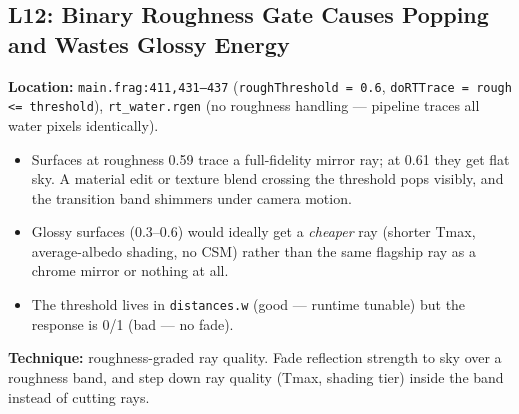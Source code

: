 \documentclass[11pt,a4paper]{article}
\begin{document}
\subsection{L12: Binary Roughness Gate Causes Popping and Wastes Glossy Energy}

\textbf{Location:} \texttt{main.frag:411,431--437} (\texttt{roughThreshold = 0.6}, \texttt{doRTTrace = rough \textless{}= threshold}), \texttt{rt\_water.rgen} (no roughness handling --- pipeline traces all water pixels identically).

\begin{itemize}
    \item Surfaces at roughness 0.59 trace a full-fidelity mirror ray; at 0.61 they get flat sky. A material edit or texture blend crossing the threshold pops visibly, and the transition band shimmers under camera motion.
    \item Glossy surfaces (0.3--0.6) would ideally get a \textit{cheaper} ray (shorter Tmax, average-albedo shading, no CSM) rather than the same flagship ray as a chrome mirror or nothing at all.
    \item The threshold lives in \texttt{distances.w} (good --- runtime tunable) but the response is 0/1 (bad --- no fade).
\end{itemize}

\textbf{Technique:} roughness-graded ray quality. Fade reflection strength to sky over a roughness band, and step down ray quality (Tmax, shading tier) inside the band instead of cutting rays.
\end{document}
